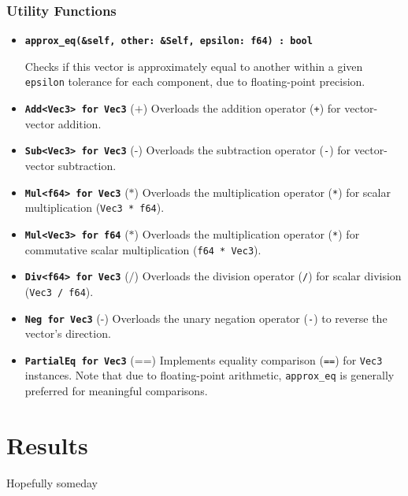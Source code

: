 \documentclass[12pt,a4paper]{article}
\begin{document}
\subsubsection{Utility Functions}
\begin{itemize}
    \item \textbf{\texttt{approx\_eq(\&self, other: \&Self, epsilon: f64) : bool}}
    
    Checks if this vector is approximately equal to another within a given \texttt{epsilon} tolerance for each component, due to floating-point precision.

    \item \textbf{\texttt{Add<Vec3> for Vec3}} ($\texttt{+}$)
    Overloads the addition operator (\texttt{+}) for vector-vector addition.

    \item \textbf{\texttt{Sub<Vec3> for Vec3}} ($\texttt{-}$)
    Overloads the subtraction operator (\texttt{-}) for vector-vector subtraction.

    \item \textbf{\texttt{Mul<f64> for Vec3}} ($\texttt{*}$)
    Overloads the multiplication operator (\texttt{*}) for scalar multiplication (\texttt{Vec3 * f64}).

    \item \textbf{\texttt{Mul<Vec3> for f64}} ($\texttt{*}$)
    Overloads the multiplication operator (\texttt{*}) for commutative scalar multiplication (\texttt{f64 * Vec3}).

    \item \textbf{\texttt{Div<f64> for Vec3}} ($\texttt{/}$)
    Overloads the division operator (\texttt{/}) for scalar division (\texttt{Vec3 / f64}).

    \item \textbf{\texttt{Neg for Vec3}} ($\texttt{-}$)
    Overloads the unary negation operator (\texttt{-}) to reverse the vector's direction.

    \item \textbf{\texttt{PartialEq for Vec3}} ($\texttt{==}$)
    Implements equality comparison (\texttt{==}) for \texttt{Vec3} instances. Note that due to floating-point arithmetic, \texttt{approx\_eq} is generally preferred for meaningful comparisons.
\end{itemize}







\section{Results}
Hopefully someday



\end{document}
